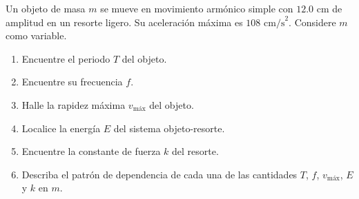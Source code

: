 \item Un objeto de masa $m$ se mueve en movimiento armónico simple con $12.0\text{ cm}$ de amplitud en un resorte ligero. Su aceleración máxima es $108\text{ cm/s}^2$. Considere $m$ como variable.
\begin{enumerate}
    \item Encuentre el periodo $T$ del objeto.
    \item Encuentre su frecuencia $f$.
    \item Halle la rapidez máxima $v_{\text{máx}}$ del objeto.
    \item Localice la energía $E$ del sistema objeto-resorte.
    \item Encuentre la constante de fuerza $k$ del resorte.
    \item Describa el patrón de dependencia de cada una de las cantidades $T$, $f$, $v_{\text{máx}}$, $E$ y $k$ en $m$.
\end{enumerate}